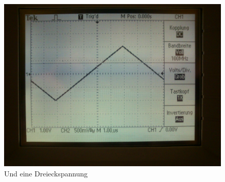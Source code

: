 \begin{figure}[H]
	\centering
	\includegraphics[width=\linewidth]{versuch3/oszi/DSC_0252.JPG}
	\caption{Und eine Dreieckspannung}
\end{figure}

